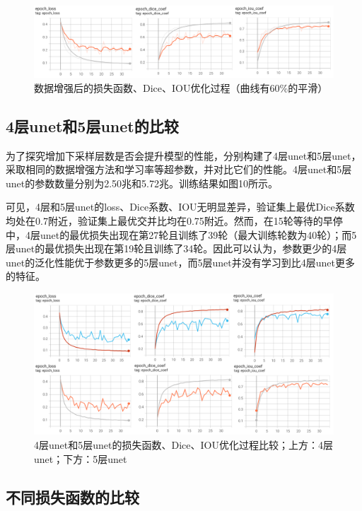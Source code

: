 \documentclass[letterpaper, 10pt, conference, twoside]{ieeeconf}
\begin{document}
\begin{figure}[htbp]
  \centering
  \includegraphics[width = 1\linewidth]{dataAug_result.png}
  \caption{数据增强后的损失函数、Dice、IOU优化过程（曲线有60\%的平滑）}
  \label{fig:fig9}
\end{figure}

\subsection{4层unet和5层unet的比较}

为了探究增加下采样层数是否会提升模型的性能，分别构建了4层unet和5层unet，采取相同的数据增强方法和学习率等超参数，并对比它们的性能。4层unet和5层unet的参数数量分别为2.50兆和5.72兆。训练结果如图10所示。

可见，4层和5层unet的loss、Dice系数、IOU无明显差异，验证集上最优Dice系数均处在0.7附近，验证集上最优交并比均在0.75附近。然而，在15轮等待的早停中，4层unet的最优损失出现在第27轮且训练了39轮（最大训练轮数为40轮）；而5层unet的最优损失出现在第19轮且训练了34轮。因此可以认为，参数更少的4层unet的泛化性能优于参数更多的5层unet，而5层unet并没有学习到比4层unet更多的特征。

\begin{figure}[htbp]
  \centering
  \includegraphics[width = 1\linewidth]{4layers-5layers.png}
  \caption{4层unet和5层unet的损失函数、Dice、IOU优化过程比较；上方：4层unet；下方：5层unet}
  \label{fig:fig10}
\end{figure}

\subsection{不同损失函数的比较}
\end{document}
